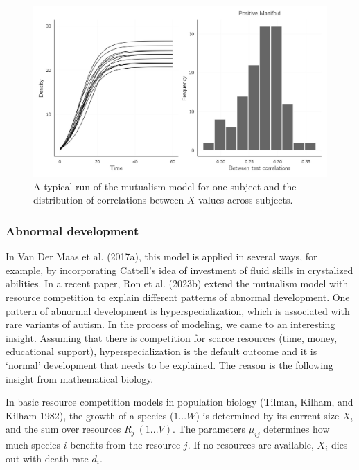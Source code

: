 \documentclass[
  a4paper,
  DIV=11,
  numbers=noendperiod,
  oneside]{scrreprt}
\begin{document}
\begin{figure}

{\centering \includegraphics{media/ch6/fig-ch6-img7-old-76.jpg}

}

\caption{\label{fig-ch6-img7-old-76}A typical run of the mutualism model
for one subject and the distribution of correlations between \(X\)
values across subjects.}

\end{figure}

\hypertarget{sec-Abnormal-development}{%
\subsubsection{Abnormal development}\label{sec-Abnormal-development}}

In Van Der Maas et al. (2017a), this model is applied in several ways,
for example, by incorporating Cattell's idea of investment of fluid
skills in crystalized abilities. In a recent paper, Ron et al. (2023b)
extend the mutualism model with resource competition to explain
different patterns of abnormal development. One pattern of abnormal
development is hyperspecialization, which is associated with rare
variants of autism. In the process of modeling, we came to an
interesting insight. Assuming that there is competition for scarce
resources (time, money, educational support), hyperspecialization is the
default outcome and it is `normal' development that needs to be
explained. The reason is the following insight from mathematical
biology.

In basic resource competition models in population biology (Tilman,
Kilham, and Kilham 1982), the growth of a species (\(1...W\)) is
determined by its current size \(X_{i}\) and the sum over resources
\(R_{j}\ (1...V)\). The parameters \(\mu_{ij}\) determines how much
species \(i\) benefits from the resource \(j\). If no resources are
available, \(X_{i}\) dies out with death rate \(d_{i}\).
\end{document}
